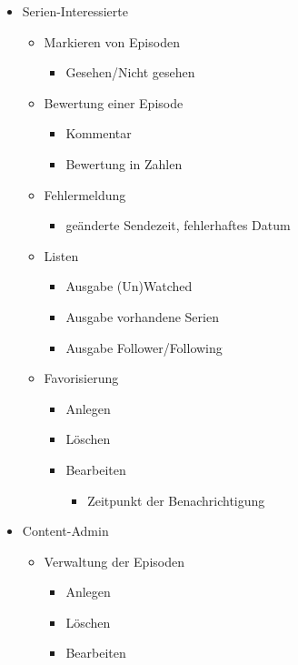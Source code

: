 \begin{itemize}
\item
Serien-Interessierte
  \begin{itemize}
  \item
    Markieren von Episoden
      \begin{itemize}
      \item
      Gesehen/Nicht gesehen
      \end{itemize}
    \item
    Bewertung einer Episode
        \begin{itemize}
        \item
        Kommentar
        \item
        Bewertung in Zahlen
        \end{itemize}
     \item
     Fehlermeldung
      \begin{itemize}
      \item
        geänderte Sendezeit, fehlerhaftes Datum
        \end{itemize}
     \item
     Listen
      \begin{itemize}
      \item
      Ausgabe (Un)Watched
      \item
      Ausgabe vorhandene Serien
      \item
      Ausgabe Follower/Following
      \end{itemize}
     \item
     Favorisierung
        \begin{itemize}
        \item
        Anlegen
        \item
        Löschen
        \item
        Bearbeiten
          \begin{itemize}
          \item
            Zeitpunkt der Benachrichtigung
            \end{itemize}
    \end{itemize}
  \end{itemize}
  \item
  Content-Admin
    \begin{itemize}
    \item
    Verwaltung der Episoden
      \begin{itemize}
      \item
      Anlegen
      \item
      Löschen
      \item
      Bearbeiten
      \end{itemize}
    \end{itemize}
\end{itemize}


